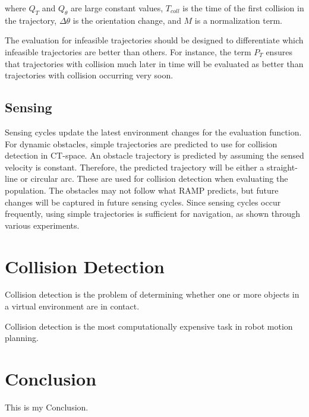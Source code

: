 \documentclass[10pt,conference]{ieeeconf}
\begin{document}
where $Q_T$ and $Q_θ$ are large constant values, $T_{coll}$ is the time
of the first collision in the trajectory, $\Delta\theta$ is the orientation change, and $M$ is a normalization term.

The evaluation for infeasible trajectories should be designed to differentiate which infeasible trajectories are better than others. For instance, the term $P_T$ ensures that trajectories with collision much later in time will be evaluated as better than trajectories with collision occurring very soon.

\subsection{Sensing}

Sensing cycles update the latest environment changes for the evaluation function. For dynamic obstacles, simple trajectories are predicted to use for collision detection in CT-space. An obstacle trajectory is predicted by assuming the sensed velocity is constant. Therefore, the predicted trajectory will be either a straight-line or circular arc. These are used for collision detection when evaluating the population. The obstacles may not follow what RAMP predicts, but future changes will be captured in future sensing cycles. Since sensing cycles occur frequently, using simple trajectories is sufficient for navigation, as shown through various experiments.

 


\section{Collision Detection}
	
	Collision detection is the problem of determining whether one or more objects in a virtual environment are in contact. 
	
	Collision detection is the most computationally expensive task in robot motion planning. 



\section{Conclusion}
    This is my Conclusion.




\end{document}

